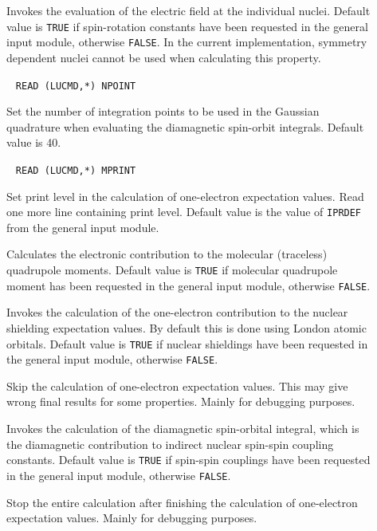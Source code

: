 \begin{description}
\item[] Invokes the evaluation of the electric
field at the individual nuclei. Default
value is \verb|TRUE| if
spin-rotation constants have been
requested in the general input
module, otherwise \verb|FALSE|. In the current implementation,
symmetry dependent nuclei cannot be used when calculating this property.

\item[]\verb| |\newline
\verb|READ (LUCMD,*) NPOINT|

Set the number of integration points to be used in the Gaussian
quadrature
when evaluating  the diamagnetic spin-orbit integrals. Default value is 40.

\item[]\verb| |\newline
\verb|READ (LUCMD,*) MPRINT|

Set print level in the calculation of one-electron expectation values.
Read one more line containing print level. Default value is the
value of \verb|IPRDEF| from the general input module.

\item[] Calculates the electronic contribution to the
molecular (traceless) quadrupole moments. Default value is \verb|TRUE|
if molecular quadrupole moment has been requested in the general input
module, otherwise \verb|FALSE|.

\item[] Invokes the calculation of the one-electron
contribution to the nuclear shielding
expectation values. By default
this is done using London atomic
orbitals. Default value is
\verb|TRUE| if nuclear shieldings have been requested in the general
input module, otherwise \verb|FALSE|.

\item[] Skip the calculation of one-electron expectation
values. This may give wrong final results for some properties. Mainly
for debugging purposes.

\item[] Invokes the calculation of the diamagnetic
spin-orbital integral, which is the
diamagnetic contribution to
indirect nuclear spin-spin coupling
constants. Default value is
\verb|TRUE| if spin-spin couplings have been requested in the general
input module, otherwise \verb|FALSE|.

\item[] Stop the entire calculation after finishing the
calculation of one-electron expectation values. Mainly for debugging
purposes.

\end{description}

